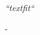 \documentclass[11pt, oneside]{Thesis} %
\begin{document}

\pagestyle{empty} %

\null\vfill %

\textit{``textfit``}

\begin{flushright}
-
\end{flushright}

\vfill
\vfill
\vfill

\vfill
\vfill
\vfill
\vfill
\null %

\clearpage %


\end{document}
